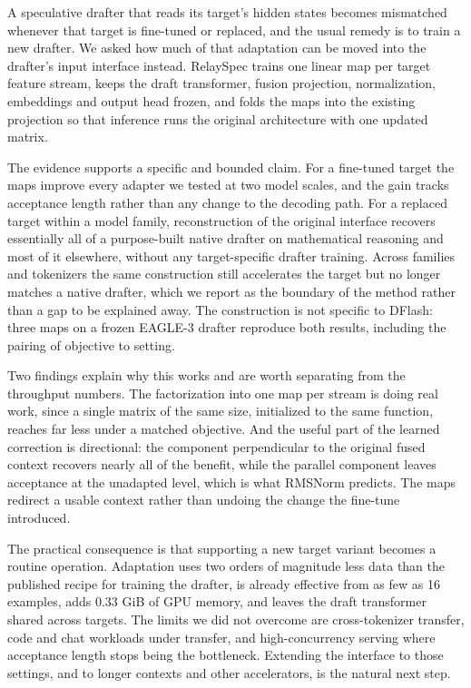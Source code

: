 A speculative drafter that reads its target's hidden states becomes mismatched whenever that target is fine-tuned or replaced, and the usual remedy is to train a new drafter. We asked how much of that adaptation can be moved into the drafter's input interface instead. RelaySpec trains one linear map per target feature stream, keeps the draft transformer, fusion projection, normalization, embeddings and output head frozen, and folds the maps into the existing projection so that inference runs the original architecture with one updated matrix.

The evidence supports a specific and bounded claim. For a fine-tuned target the maps improve every adapter we tested at two model scales, and the gain tracks acceptance length rather than any change to the decoding path. For a replaced target within a model family, reconstruction of the original interface recovers essentially all of a purpose-built native drafter on mathematical reasoning and most of it elsewhere, without any target-specific drafter training. Across families and tokenizers the same construction still accelerates the target but no longer matches a native drafter, which we report as the boundary of the method rather than a gap to be explained away. The construction is not specific to DFlash: three maps on a frozen EAGLE-3 drafter reproduce both results, including the pairing of objective to setting.

Two findings explain why this works and are worth separating from the throughput numbers. The factorization into one map per stream is doing real work, since a single matrix of the same size, initialized to the same function, reaches far less under a matched objective. And the useful part of the learned correction is directional: the component perpendicular to the original fused context recovers nearly all of the benefit, while the parallel component leaves acceptance at the unadapted level, which is what RMSNorm predicts. The maps redirect a usable context rather than undoing the change the fine-tune introduced.

The practical consequence is that supporting a new target variant becomes a routine operation. Adaptation uses two orders of magnitude less data than the published recipe for training the drafter, is already effective from as few as 16 examples, adds 0.33 GiB of GPU memory, and leaves the draft transformer shared across targets. The limits we did not overcome are cross-tokenizer transfer, code and chat workloads under transfer, and high-concurrency serving where acceptance length stops being the bottleneck. Extending the interface to those settings, and to longer contexts and other accelerators, is the natural next step.
